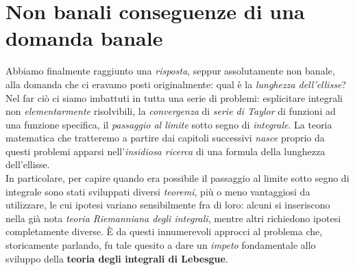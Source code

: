 \section{Non banali conseguenze di una domanda banale}
Abbiamo finalmente raggiunto una \textit{risposta}, seppur assolutamente non banale, alla domanda che ci eravamo posti originalmente: qual è la \textit{lunghezza dell'ellisse}? Nel far ciò ci siamo imbattuti in tutta una serie di problemi: esplicitare integrali non \textit{elementarmente} risolvibili, la \textit{convergenza} di \textit{serie di Taylor} di funzioni ad una funzione specifica, il \textit{passaggio al limite} sotto segno di \textit{integrale}.
La teoria matematica che tratteremo a partire dai capitoli successivi \textit{nasce} proprio da questi problemi apparsi nell'\textit{insidiosa ricerca} di una formula della lunghezza dell'ellisse.\\
In particolare, per capire quando era possibile il passaggio al limite sotto segno di integrale sono stati sviluppati diversi \textit{teoremi}, più o meno vantaggiosi da utilizzare, le cui ipotesi variano sensibilmente fra di loro: alcuni si inseriscono nella già nota \textit{teoria Riemanniana degli integrali}, mentre altri richiedono ipotesi completamente diverse. È da questi innumerevoli approcci al problema che, storicamente parlando, fu tale quesito a dare un \textit{impeto} fondamentale allo sviluppo della \textbf{teoria degli integrali di Lebesgue}.